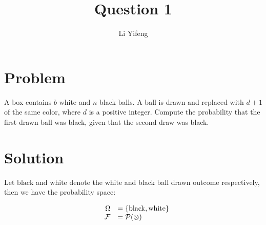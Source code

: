 \documentclass{article}
\title{Question 1}
\author{Li Yifeng}
\begin{document}
\maketitle

\section*{Problem}

A box contains $b$ white and $n$ black balls. A ball is drawn and replaced with $d+1$ of the same color, where $d$ is a positive integer. Compute the probability that the first drawn ball was black, given that the second draw was black.

\section*{Solution}

Let $\mathrm{black}$ and $\mathrm{white}$ denote the white and black ball drawn outcome respectively, then we have the probability space:

\[
\begin{array}{rl}
	\Omega&=\{\mathrm{black},\mathrm{white}\} \\
	\quad\cal{F}&=\cal{P}(\Omega) \\
\end{array}
\]
\end{document}
